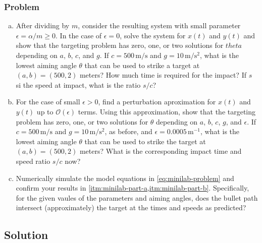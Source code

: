 \documentclass[12pt]{article}
\begin{document}
\subsubsection*{Problem}
\begin{enumerate}[(a)]
\item\label{itm:minilab-part-a} After dividing by $m$, consider the resulting
  system with small parameter $\epsilon=\alpha/m\ge0$. In the case of
  $\epsilon=0$, solve the system for $x(t)$ and $y(t)$ and show that the
  targeting problem has zero, one, or two solutions for $theta$ depending on
  $a$, $b$, $c$, and $g$. If $c=500\,\text{m/s}$ and $g=10\,\text{m/s$^2$}$,
  what is the lowest aiming angle $\theta$ that can be used to strike a target
  at $(a,b)=(500,2)$ meters? How much time is required for the impact? If $s$ si
  the speed at impact, what is the ratio $s/c$?
\item\label{itm:minilab-part-b} For the case of small $\epsilon>0$, find a
  perturbation aproximation for $x(t)$ and $y(t)$ up to $\mathcal{O}(\epsilon)$
  terms. Using this approximation, show that the targeting problem has zero,
  one, or two solutions for $\theta$ depending on $a$, $b$, $c$, $g$, and
  $\epsilon$. If $c=500\,\text{m/s}$ and $g=10\,\text{m/s$^2$}$, as before, and
  $\epsilon=0.0005\,\text{m$^{-1}$}$, what is the lowest aiming angle $\theta$
  that can be used to strike the target at $(a,b)=(500,2)$ meters? What is the
  corresponding impact time and speed ratio $s/c$ now?
\item Numerically simulate the model equations in \cref{eq:minilab-problem} and
  confirm your results in \cref{itm:minilab-part-a,itm:minilab-part-b}.
  Specifically, for the given vaules of the parameters and aiming angles, does
  the bullet path intersect (approximately) the target at the times and speeds
  as predicted?
\end{enumerate}
\newpage
\subsection*{Solution}
\todo{}
\end{document}
